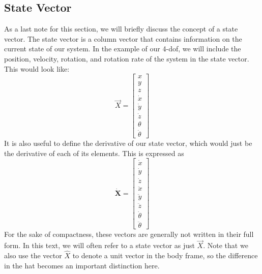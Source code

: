 \documentclass[12pt]{report}
\begin{document}
\subsection{State Vector}
As a last note for this section, we will briefly discuss the concept of a \gls{state vector}. The \gls{state vector} is a column vector that contains information on the current state of our system. In the example of our 4-\gls{dof}, we will include the position, velocity, rotation, and rotation rate of the system in the \gls{state vector}. This would look like:
$$\vec{X}=\begin{bmatrix}
    x\\y\\z\\\dot{x}\\\dot{y}\\\dot{z}\\\theta\\\dot{\theta}
\end{bmatrix}$$
It is also useful to define the derivative of our \gls{state vector}, which would just be the derivative of each of its elements. This is expressed as
$$\dot{\textbf{X}}=\begin{bmatrix}
    \dot{x}\\\dot{y}\\\dot{z}\\\ddot{x}\\\ddot{y}\\\ddot{z}\\\dot{\theta}\\\ddot{\theta}
\end{bmatrix}$$
For the sake of compactness, these vectors are generally not written in their full form. In this text, we will often refer to a \gls{state vector} as just $\vec{X}$. Note that we also use the vector $\hat{X}$ to denote a unit vector in the body frame, so the difference in the hat becomes an important distinction here.
\end{document}
